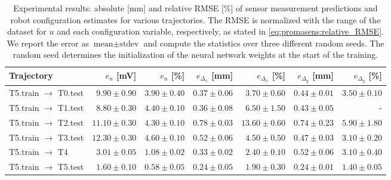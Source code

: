 \begingroup
\setlength{\tabcolsep}{6pt} %
\begin{table}\footnotesize
\centering
\caption{Experimental results: absolute [mm] and relative RMSE [\%] of sensor measurement predictions and robot configuration estimates for various trajectories. The RMSE is normalized with the range of the dataset for $u$ and each configuration variable, respectively, as stated in \eqref{eq:promasens:relative_RMSE}. We report the error as $\text{mean} \pm \text{stdev}$ and compute the statistics over three different random seeds. The random seed determines the initialization of the neural network weights at the start of the training.}
\begin{tabular}{l rr rrrr}\toprule
\textbf{Trajectory} & $e_{u}$ [mV] & $e_{u}$ [\%] & $e_{\Delta_x}$ [mm] & $e_{\Delta_x}$ [\%] & $e_{\Delta_y}$ [mm] & $e_{\Delta_y}$ [\%]\\
\midrule
T5.train $\rightarrow$ T0.test & $9.90 \pm 0.90$ & $3.90 \pm 0.40$ & $0.37 \pm 0.06$ & $3.70 \pm 0.60$ & $0.44 \pm 0.01$ & $3.50 \pm 0.10$\\ %
T5.train $\rightarrow$ T1.test & $8.80 \pm 0.30$ & $4.40 \pm 0.10$ & $0.36 \pm 0.08$ & $6.50 \pm 1.50$ & $0.43 \pm 0.05$ & -\\ %
T5.train $\rightarrow$ T2.test & $11.10 \pm 0.30$ & $4.30 \pm 0.10$ & $0.78 \pm 0.03$ & $13.60 \pm 0.60$ & $0.74 \pm 0.23$ & $5.90 \pm 1.80$\\ %
T5.train $\rightarrow$ T3.test & $12.30 \pm 0.30$ & $4.60 \pm 0.10$ & $0.52 \pm 0.06$ & $4.50 \pm 0.50$ & $0.47 \pm 0.03$ & $3.10 \pm 0.20$\\ %
T5.train $\rightarrow$ T4 & $3.01 \pm 0.05$ & $1.08 \pm 0.02$ & $0.33 \pm 0.02$ & $2.40 \pm 0.10$ & $0.52 \pm 0.06$ & $3.10 \pm 0.40$\\ %
T5.train $\rightarrow$ T5.test & $1.60 \pm 0.10$ & $0.58 \pm 0.05$ & $0.24 \pm 0.05$ & $1.90 \pm 0.30$ & $0.24 \pm 0.01$ & $1.40 \pm 0.05$\\ %
\bottomrule
\end{tabular}
\label{tab:results_experiments}
\end{table}
\endgroup

